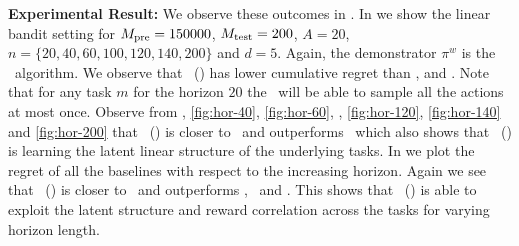 \textbf{Experimental Result:} We observe these outcomes in . In  we show the linear bandit setting for $M_{\text{pre}} =  150000$, $M_{\text{test}} = 200$, $A=20$, $n=\{20, 40, 60, 100, 120, 140, 200\}$ and $d=5$. 
%
%
Again, the demonstrator $\pi^w$ is the \ts\ algorithm. We observe that \pred\ (\gt) has lower cumulative regret than \dptg, and \ad. Note that for any task $m$ for the horizon $20$ the \ts\ will be able to sample all the actions at most once.
%
%
Observe from , \ref{fig:hor-40}, \ref{fig:hor-60}, , \ref{fig:hor-120}, \ref{fig:hor-140} and \ref{fig:hor-200} that \pred\ (\gt) is closer to \linucb\ and outperforms \ts\ which also shows that \pred\ (\gt) is learning the latent linear structure of the underlying tasks.
%
In  we plot the regret of all the baselines with respect to the increasing horizon. Again we see that \pred\ (\gt) is closer to \linucb\ and outperforms \dptg, \ad\ and \ts.
%
%
This shows that \pred\ (\gt) is able to exploit the latent structure and reward correlation across the tasks for varying horizon length.



